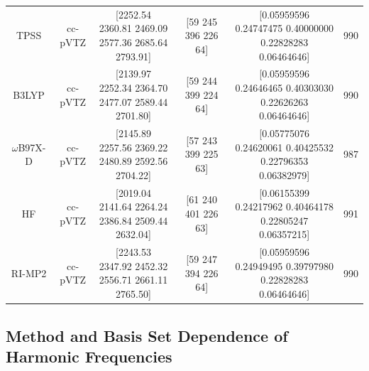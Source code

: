 \documentclass[%
  class = book,%
  crop = false,%
  float = true,%
  multi = true,%
  preview = false,%
]{standalone}
\begin{document}
\begin{landscape}
\begin{table}
\begin{tabular}{cccccc}
      TPSS & cc-pVTZ & \makecell{[2252.54 2360.81 2469.09 \\ 2577.36 2685.64 2793.91]} & [59 245 396 226 64] & \makecell{[0.05959596 0.24747475 0.40000000 \\ 0.22828283 0.06464646]} & 990 \\
      B3LYP & cc-pVTZ & \makecell{[2139.97 2252.34 2364.70 \\ 2477.07 2589.44 2701.80]} & [59 244 399 224 64] & \makecell{[0.05959596 0.24646465 0.40303030 \\ 0.22626263 0.06464646]} & 990 \\
      \(\omega\)B97X-D & cc-pVTZ & \makecell{[2145.89 2257.56 2369.22 \\ 2480.89 2592.56 2704.22]} & [57 243 399 225 63] & \makecell{[0.05775076 0.24620061 0.40425532 \\ 0.22796353 0.06382979]} & 987 \\
      HF & cc-pVTZ & \makecell{[2019.04 2141.64 2264.24 \\ 2386.84 2509.44 2632.04]} & [61 240 401 226 63] & \makecell{[0.06155399 0.24217962 0.40464178 \\ 0.22805247 0.06357215]} & 991 \\
      RI-MP2 & cc-pVTZ & \makecell{[2243.53 2347.92 2452.32 \\ 2556.71 2661.11 2765.50]} & [59 247 394 226 64] & \makecell{[0.05959596 0.24949495 0.39797980 \\ 0.22828283 0.06464646]} & 990 \\
      \bottomrule
    \end{tabular}
  \end{table}
\end{landscape}

\subsection{Method and Basis Set Dependence of Harmonic Frequencies}
\label{paper_02:ssec:SI3}
\end{document}
